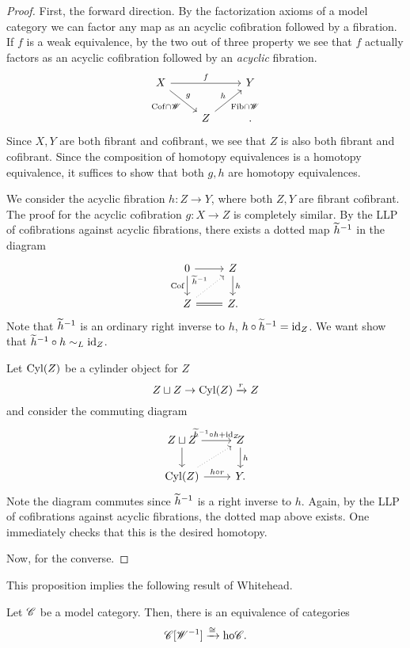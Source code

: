 \documentclass[11pt]{amsart}
\def\Cyl{{\rm Cyl}}
\def\ho{{\rm ho}}
\begin{document}
\begin{proof}
First, the forward direction. 
By the factorization axioms of a model category we can factor any map as an acyclic cofibration followed by a fibration. 
If $f$ is a weak equivalence, by the two out of three property we see that $f$ actually factors as an acyclic cofibration followed by an {\em acyclic} fibration. 
\[
\begin{tikzcd}
X \ar[rr,"f"] \ar[dr, "{\rm Cof} \cap \sW"', "g"] & & Y \\
& Z \ar[ur, "{\rm Fib} \cap \sW"', "h"] & .
\end{tikzcd}
\]
Since $X,Y$ are both fibrant and cofibrant, we see that $Z$ is also both fibrant and cofibrant. 
Since the composition of homotopy equivalences is a homotopy equivalence, it suffices to show that both $g,h$ are homotopy equivalences. 

We consider the acyclic fibration $h : Z \to Y$, where both $Z,Y$ are fibrant cofibrant.
The proof for the acyclic cofibration $g : X \to Z$ is completely similar.
By the LLP of cofibrations against acyclic fibrations, there exists a dotted map $\Tilde{h}^{-1}$ in the diagram
\[
\begin{tikzcd}
0 \ar[r] \ar[d,"{\rm Cof}"'] & Z \ar[d, "h"] \\
Z \ar[r, equals] \ar[ur, dotted, "\Tilde{h}^{-1}"] & Z .
\end{tikzcd}
\]
Note that $\Tilde{h}^{-1}$ is an ordinary right inverse to $h$, $h \circ \Tilde{h}^{-1} = \id_Z$.
We want show that $\Tilde{h}^{-1} \circ h \sim_L \id_Z$. 

Let $\Cyl(Z)$ be a cylinder object for $Z$
\[
Z \sqcup Z \to \Cyl(Z) \xto{r} Z
\] 
and consider the commuting diagram
\[
\begin{tikzcd}
Z \sqcup Z \ar[d] \ar[r, "\Tilde{h}^{-1} \circ h + \id_Z"] & Z \ar[d,"h"] \\
\Cyl(Z) \ar[ur, dotted] \ar[r, "h \circ r"] & Y .
\end{tikzcd}
\]
Note the diagram commutes since $\Tilde{h}^{-1}$ is a right inverse to $h$. 
Again, by the LLP of cofibrations against acyclic fibrations, the dotted map above exists. 
One immediately checks that this is the desired homotopy. 

Now, for the converse. 

\end{proof}

This proposition implies the following result of Whitehead. 

\begin{thm}[Whitehead]
Let $\sC$ be a model category. 
Then, there is an equivalence of categories
\[
\sC[\sW^{-1}] \xto{\cong} \ho \sC .
\]
\end{thm}
\end{document}
